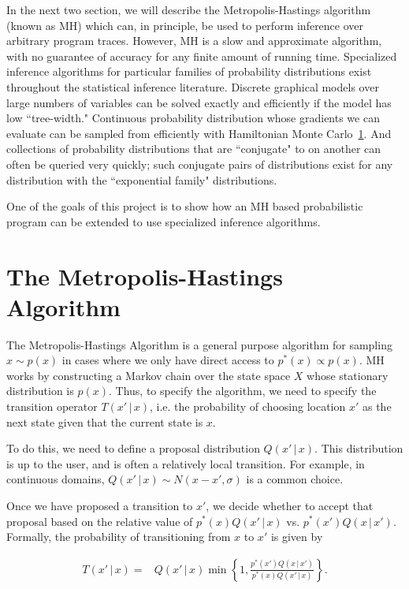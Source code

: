 \documentclass{article}
\begin{document}
In the next two section, we will describe the Metropolis-Hastings algorithm
(known as MH) which can, in principle, be used to perform inference over
arbitrary program traces. However, MH is a slow and approximate algorithm, with
no guarantee of accuracy for any finite amount of running time. Specialized
inference algorithms for particular families of probability distributions exist
throughout the statistical inference literature. Discrete graphical models over
large numbers of variables can be solved exactly and efficiently if the model
has low ``tree-width." Continuous probability distribution whose gradients we can
evaluate can be sampled from efficiently with Hamiltonian Monte Carlo~\ref{}.
And collections of probability distributions that are ``conjugate" to on another
can often be queried very quickly; such conjugate pairs of distributions exist
for any distribution with the ``exponential family" distributions.

One of the goals of this project is to show how an MH based probabilistic
program can be extended to use specialized inference algorithms. 

\section{The Metropolis-Hastings Algorithm}

The Metropolis-Hastings Algorithm is a general purpose algorithm for sampling $x
\sim p(x)$ in cases where we only have direct access to $p^*(x) \propto
p(x)$. MH works by constructing a Markov chain over the state space $X$ whose
stationary distribution is $p(x)$. Thus, to specify the algorithm, we need to
specify the transition operator $T(x'\,|\,x)$, i.e. the probability of choosing
location $x'$ as the next state given that the current state is $x$. 

To do this, we need to define a proposal distribution $Q(x' \, | \, x)$. This
distribution is up to the user, and is often a relatively local transition. For
example, in continuous domains, $Q(x' \, | \, x) \sim N(x-x', \sigma)$ is a common
choice. 

Once we have proposed a transition to $x'$, we decide whether to accept that
proposal based on the relative value of $p^*(x) Q(x' \,| \, x)$ vs. $p^*(x') Q(x
\,| \, x')$. Formally, the probability of transitioning from $x$ to $x'$ is
given by  

\begin{align}
T(x'\, |\, x) =& Q(x' \, |\, x)\min \left \{1, 
                    \frac{p^*(x') Q(x \, |\, x')} 
                    {p^*(x) Q(x' \, |\, x)} \right \}.
\end{align}
\end{document}
